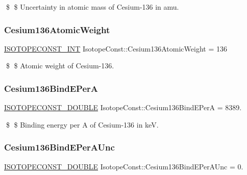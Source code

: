 \$ \$ Uncertainty in atomic mass of Cesium-\/136 in amu. \mbox{\label{group___isotope_const-_cesium-_cs136_ga4e37e5e1140f4bc7fb932ed64d631fc4}} 
\subsubsection{\texorpdfstring{Cesium136\+Atomic\+Weight}{Cesium136AtomicWeight}}
{\footnotesize\ttfamily \mbox{\hyperlink{group___isotope_const-_macros_ga5f18360b3e99483a35c32d789e62621c}{I\+S\+O\+T\+O\+P\+E\+C\+O\+N\+S\+T\+\_\+\+I\+NT}} Isotope\+Const\+::\+Cesium136\+Atomic\+Weight = 136}

\$ \$ Atomic weight of Cesium-\/136. \mbox{\label{group___isotope_const-_cesium-_cs136_gaf2fdb915361d4111cacf90c07673dc13}} 
\subsubsection{\texorpdfstring{Cesium136\+Bind\+E\+PerA}{Cesium136BindEPerA}}
{\footnotesize\ttfamily \mbox{\hyperlink{group___isotope_const-_macros_ga8f45a7272ce02c0b4c65c44636ed719a}{I\+S\+O\+T\+O\+P\+E\+C\+O\+N\+S\+T\+\_\+\+D\+O\+U\+B\+LE}} Isotope\+Const\+::\+Cesium136\+Bind\+E\+PerA = 8389.}

\$ \$ Binding energy per A of Cesium-\/136 in keV. \mbox{\label{group___isotope_const-_cesium-_cs136_gace0196df7b3eac62c5c08f6472bcfe4b}} 
\subsubsection{\texorpdfstring{Cesium136\+Bind\+E\+Per\+A\+Unc}{Cesium136BindEPerAUnc}}
{\footnotesize\ttfamily \mbox{\hyperlink{group___isotope_const-_macros_ga8f45a7272ce02c0b4c65c44636ed719a}{I\+S\+O\+T\+O\+P\+E\+C\+O\+N\+S\+T\+\_\+\+D\+O\+U\+B\+LE}} Isotope\+Const\+::\+Cesium136\+Bind\+E\+Per\+A\+Unc = 0.}

